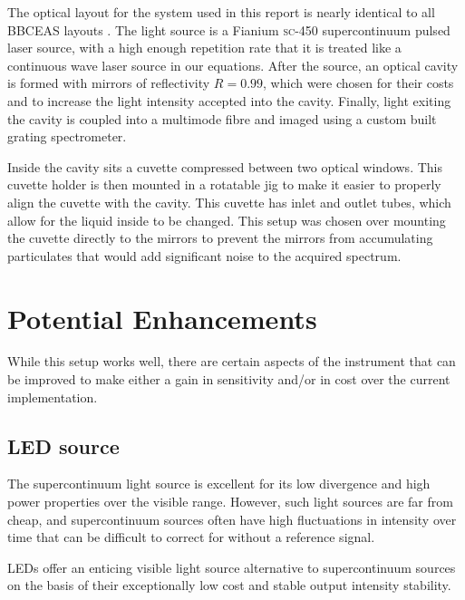 The optical layout for the system used in this report is nearly identical to
all \ac{BBCEAS} layouts \cite{Berden:2009wk}. The light source is a Fianium
\textsc{sc-450} supercontinuum pulsed laser source, with a high enough
repetition rate that it is treated like a continuous wave laser source in
our equations. After the source, an optical cavity is formed with mirrors of
reflectivity $R=0.99$, which were chosen for their costs and to increase the
light intensity accepted into the cavity. Finally, light exiting the cavity
is coupled into a multimode fibre and imaged using a custom built grating
spectrometer.

Inside the cavity sits a cuvette compressed between two optical windows. This
cuvette holder is then mounted in a rotatable jig to make it easier to properly
align the cuvette with the cavity. This cuvette has inlet and outlet tubes,
which allow for the liquid inside to be changed. This setup was chosen over
mounting the cuvette directly to the mirrors \cite{Seetohul:2009ij} to prevent
the mirrors from accumulating particulates that would add significant noise to
the acquired spectrum.



\section{Potential Enhancements}\label{sec:bbceas_enhance}

While this setup works well, there are certain aspects of the instrument that
can be improved to make either a gain in sensitivity and/or in cost over the
current implementation.

\subsection{LED source}\label{sec:bbceas_led}


The supercontinuum light source is excellent for its low divergence and high
power properties over the visible range. However, such light sources are far
from cheap, and supercontinuum sources often have high fluctuations in
intensity over time that can be difficult to correct for without a reference
signal.

\acp{LED} offer an enticing visible light source alternative to supercontinuum
sources on the basis of their exceptionally low cost and stable output
intensity stability.

